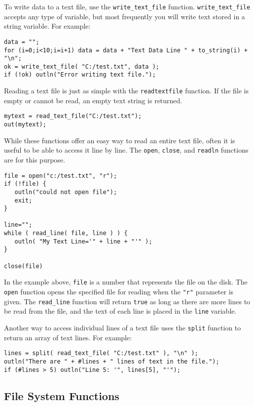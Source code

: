 \documentclass{article}
\begin{document}
To write data to a text file, use the \texttt{write\_text\_file} function.  \texttt{write\_text\_file} accepts any type of variable, but most frequently you will write text stored in a string variable.  For example:

\begin{verbatim}
data = "";
for (i=0;i<10;i=i+1) data = data + "Text Data Line " + to_string(i) + "\n";
ok = write_text_file( "C:/test.txt", data );
if (!ok) outln("Error writing text file.");
\end{verbatim}

Reading a text file is just as simple with the \texttt{readtextfile} function.  If the file is empty or cannot be read, an empty text string is returned.

\begin{verbatim}
mytext = read_text_file("C:/test.txt");
out(mytext);
\end{verbatim}

While these functions offer an easy way to read an entire text file, often it is useful to be able to access it line by line.  The \texttt{open}, \texttt{close}, and \texttt{readln} functions are for this purpose. 

\begin{verbatim}
file = open("c:/test.txt", "r");
if (!file) {
   outln("could not open file");
   exit;
}

line="";
while ( read_line( file, line ) ) {
   outln( "My Text Line='" + line + "'" );
}

close(file)
\end{verbatim}

In the example above, \texttt{file} is a number that represents the file on the disk.  The \texttt{open} function opens the specified file for reading when the \texttt{"r"} parameter is given.  The \texttt{read\_line} function will return \texttt{true} as long as there are more lines to be read from the file, and the text of each line is placed in the \texttt{line} variable.

Another way to access individual lines of a text file uses the \texttt{split} function to return an array of text lines.  For example:

\begin{verbatim}
lines = split( read_text_file( "C:/test.txt" ), "\n" );
outln("There are " + #lines + " lines of text in the file.");
if (#lines > 5) outln("Line 5: '", lines[5], "'");
\end{verbatim}

\subsection{File System Functions}
\end{document}

